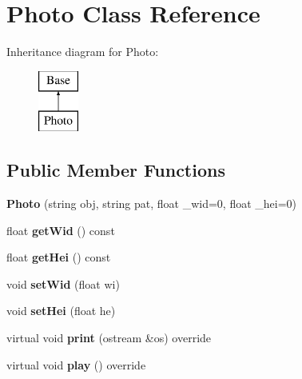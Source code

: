 \hypertarget{class_photo}{}\section{Photo Class Reference}
\label{class_photo}
Inheritance diagram for Photo\+:\begin{figure}[H]
\begin{center}
\leavevmode
\includegraphics[height=2.000000cm]{class_photo}
\end{center}
\end{figure}
\subsection*{Public Member Functions}
\begin{DoxyCompactItemize}
\item 
{\bfseries Photo} (string obj, string pat, float \+\_\+wid=0, float \+\_\+hei=0)\hypertarget{class_photo_a1b8648212e291ecee50c9d43e8383cfc}{}\label{class_photo_a1b8648212e291ecee50c9d43e8383cfc}

\item 
float {\bfseries get\+Wid} () const \hypertarget{class_photo_ac98a0affa9a26d288cc69929ce8940b7}{}\label{class_photo_ac98a0affa9a26d288cc69929ce8940b7}

\item 
float {\bfseries get\+Hei} () const \hypertarget{class_photo_adaa07219604bb7330eb29e90a5f584ce}{}\label{class_photo_adaa07219604bb7330eb29e90a5f584ce}

\item 
void {\bfseries set\+Wid} (float wi)\hypertarget{class_photo_a022cfb5b882184ddc999bb82484f13be}{}\label{class_photo_a022cfb5b882184ddc999bb82484f13be}

\item 
void {\bfseries set\+Hei} (float he)\hypertarget{class_photo_a5084839d44991247d9127ad8404fba85}{}\label{class_photo_a5084839d44991247d9127ad8404fba85}

\item 
virtual void {\bfseries print} (ostream \&os) override\hypertarget{class_photo_ac0d0e8276f3f5cf020bdde5b115fd017}{}\label{class_photo_ac0d0e8276f3f5cf020bdde5b115fd017}

\item 
virtual void {\bfseries play} () override\hypertarget{class_photo_a38cc8ab7ab354411e2fb49642880b373}{}\label{class_photo_a38cc8ab7ab354411e2fb49642880b373}

\end{DoxyCompactItemize}

